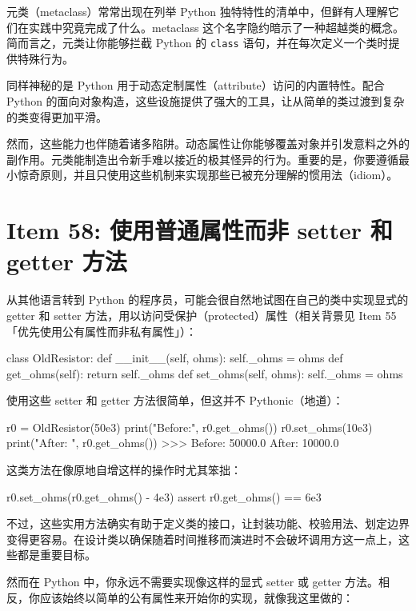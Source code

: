 元类（metaclass）常常出现在列举 Python 独特特性的清单中，但鲜有人理解它们在实践中究竟完成了什么。metaclass 这个名字隐约暗示了一种超越类的概念。简而言之，元类让你能够拦截 Python 的 \texttt{class} 语句，并在每次定义一个类时提供特殊行为。

同样神秘的是 Python 用于动态定制属性（attribute）访问的内置特性。配合 Python 的面向对象构造，这些设施提供了强大的工具，让从简单的类过渡到复杂的类变得更加平滑。

然而，这些能力也伴随着诸多陷阱。动态属性让你能够覆盖对象并引发意料之外的副作用。元类能制造出令新手难以接近的极其怪异的行为。重要的是，你要遵循最小惊奇原则，并且只使用这些机制来实现那些已被充分理解的惯用法（idiom）。

\section{Item 58: 使用普通属性而非 setter 和 getter 方法}

从其他语言转到 Python 的程序员，可能会很自然地试图在自己的类中实现显式的 getter 和 setter 方法，用以访问受保护（protected）属性（相关背景见 Item 55「优先使用公有属性而非私有属性」）：

\begin{codebox}[python]
class OldResistor:
    def __init__(self, ohms):
        self._ohms = ohms
    def get_ohms(self):
        return self._ohms
    def set_ohms(self, ohms):
        self._ohms = ohms
\end{codebox}

使用这些 setter 和 getter 方法很简单，但这并不 Pythonic（地道）：

\begin{codebox}[python]
r0 = OldResistor(50e3)
print("Before:", r0.get_ohms())
r0.set_ohms(10e3)
print("After: ", r0.get_ohms())
>>>
Before: 50000.0
After:  10000.0
\end{codebox}

这类方法在像原地自增这样的操作时尤其笨拙：

\begin{codebox}[python]
r0.set_ohms(r0.get_ohms() - 4e3)
assert r0.get_ohms() == 6e3
\end{codebox}

不过，这些实用方法确实有助于定义类的接口，让封装功能、校验用法、划定边界变得更容易。在设计类以确保随着时间推移而演进时不会破坏调用方这一点上，这些都是重要目标。

然而在 Python 中，你永远不需要实现像这样的显式 setter 或 getter 方法。相反，你应该始终以简单的公有属性来开始你的实现，就像我这里做的：


